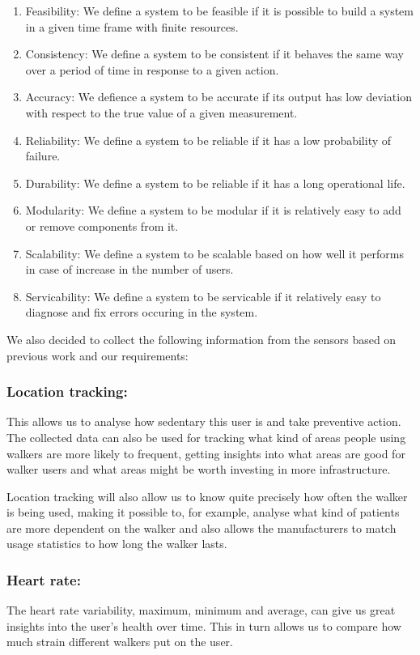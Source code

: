 \begin{enumerate}
	\item Feasibility: We define a system to be feasible if it is possible to build a system in a given time frame with finite resources.
	\item Consistency: We define a system to be consistent if it behaves the same way over a period of time in response to a given action.
	\item Accuracy: We defience a system to be accurate if its output has low deviation with respect to the true value of a given measurement.
	\item Reliability: We define a system to be reliable if it has a low probability of failure.
	\item Durability: We define a system to be reliable if it has a long operational life.
	\item Modularity: We define a system to be modular if it is relatively easy to add or remove components from it.
	\item Scalability: We define a system to be scalable based on how well it performs in case of increase in the number of users.
	\item Servicability: We define a system to be servicable if it relatively easy to diagnose and fix errors occuring in the system.
\end{enumerate}

We also decided to collect the following information from the sensors based on previous work \cite{postolache2011smart} and our requirements: 



\subsubsection{Location tracking:}
This allows us to analyse how sedentary this user is and take preventive action. The collected data can also be used for tracking what kind of areas people using walkers are more likely to frequent, getting insights into what areas are good for walker users and what areas might be worth investing in more infrastructure.

Location tracking will also allow us to know quite precisely how often the walker is being used, making it possible to, for example, analyse what kind of patients are more dependent on the walker and also allows the manufacturers to match usage statistics to how long the walker lasts.

\subsubsection{Heart rate:}
The heart rate variability, maximum, minimum and average, can give us great insights into the user’s health over time. This in turn allows us to compare how much strain different walkers put on the user.

